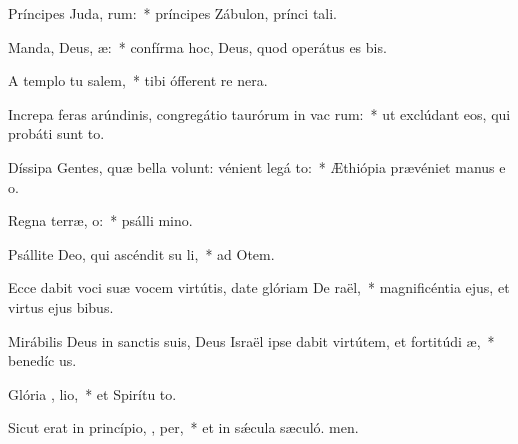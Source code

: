 \item Príncipes Juda,  rum:~* príncipes Zábulon, prínci tali.
\item Manda, Deus,  æ:~* confírma hoc, Deus, quod operátus es  bis.
\item A templo tu  salem,~* tibi ófferent re nera.
\item Increpa feras arúndinis, congregátio taurórum in vac rum:~* ut exclúdant eos, qui probáti sunt to.
\item Díssipa Gentes, quæ bella volunt: vénient legá  to:~* Æthiópia prævéniet manus e o.
\item Regna terræ,  o:~* psálli mino.
\item Psállite Deo, qui ascéndit su  li,~* ad Otem.
\item Ecce dabit voci suæ vocem virtútis, date glóriam De  raël,~* magnificéntia ejus, et virtus ejus  bibus.
\item Mirábilis Deus in sanctis suis, Deus Israël ipse dabit virtútem, et fortitúdi  æ,~* benedíc us.
\item Glória ,  lio,~* et Spirítu to.
\item Sicut erat in princípio,  ,  per,~* et in sǽcula sæculó. men.

